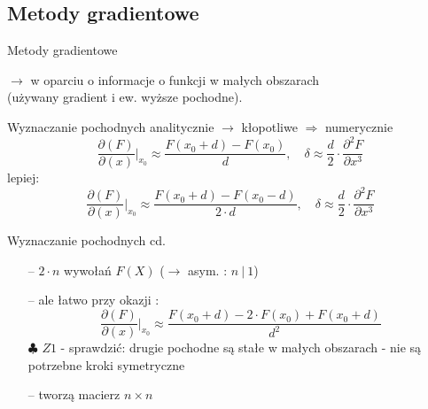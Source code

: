 \subsection{Metody gradientowe}

  \begin{frame}{Metody gradientowe}

 	$\rightarrow$ w oparciu o informacje o funkcji w małych obszarach
 	\\(używany gradient i ew. wyższe pochodne).
    \begin{block}{Wyznaczanie pochodnych}
 	   analitycznie $\rightarrow$ kłopotliwe $\Rightarrow$ numerycznie
 	   \begin{displaymath}
 	   	  \frac{\partial (F)}{\partial (x)} \bigg\vert_{x_0} \approx \frac{F(x_0+d) - F(x_0)}{d},
 	   	  \quad \delta \approx \frac{d}{2} \cdot \frac{\partial^2F}{\partial x^3}
 	   \end{displaymath}
 	   lepiej:
 	   \begin{displaymath}
 	   	  \frac{\partial (F)}{\partial (x)} \bigg\vert_{x_0} \approx \frac{F(x_0+d) - F(x_0-d)}{2\cdot d},
 	   	  \quad \delta \approx \frac{d}{2} \cdot \frac{\partial^2F}{\partial x^3}
 	   \end{displaymath}
  	\end{block}

  \end{frame}

  \begin{frame}{Wyznaczanie pochodnych cd.}

    \begin{block}{}
      \begin{itemize}
 	      \item[--] $2 \cdot n$ wywołań $F(X)$ ($\rightarrow$ asym. : $n\ |\ 1$)
 	      \item[--] ale łatwo przy okazji :
 	  	  \begin{displaymath}
 	   	  	\frac{\partial (F)}{\partial (x)} \bigg\vert_{x_0} \approx \frac{F(x_0+d) - 2 \cdot F(x_0) + F(x_0+d)}{d^2}
 	      \end{displaymath}
 	      $\clubsuit$ $Z1$ - sprawdzić: drugie pochodne są stałe w małych obszarach - nie są potrzebne kroki symetryczne
 	      \item[--] tworzą macierz $n \times n$
      \end{itemize}
  	\end{block}

  \end{frame}

